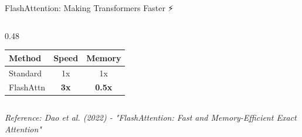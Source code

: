 \documentclass[aspectratio=169]{beamer}
\begin{document}
\begin{frame}[shrink=10]{FlashAttention: Making Transformers Faster ⚡}
\begin{columns}[T]
\begin{column}{0.48\textwidth}
\begin{center}
\begin{tabular}{lcc}
\toprule
\textbf{Method} & \textbf{Speed} & \textbf{Memory} \\
\midrule
Standard & 1x & 1x \\
FlashAttn & \textbf{3x} & \textbf{0.5x} \\
\bottomrule
\end{tabular}
\end{center}
\end{column}
\end{columns}

\vspace{0.5em}
\small
\textit{Reference: Dao et al. (2022) - "FlashAttention: Fast and Memory-Efficient Exact Attention"}
\end{frame}
\end{document}
